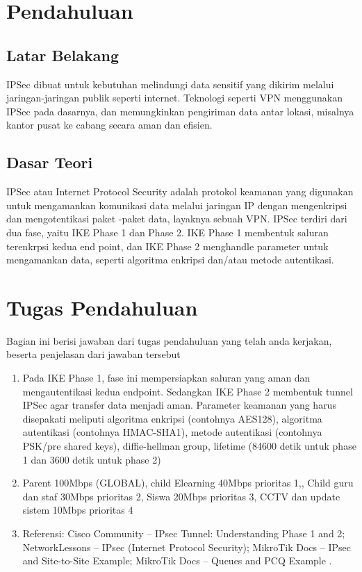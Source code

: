 \section{Pendahuluan}
\subsection{Latar Belakang}
IPSec dibuat untuk kebutuhan melindungi data sensitif yang dikirim melalui jaringan-jaringan publik seperti internet. Teknologi seperti VPN menggunakan IPSec pada dasarnya, dan memungkinkan pengiriman data antar lokasi, misalnya kantor pusat ke cabang secara aman dan efisien.

\subsection{Dasar Teori}
IPSec atau Internet Protocol Security adalah protokol keamanan yang digunakan untuk mengamankan komunikasi data melalui jaringan IP dengan mengenkripsi dan mengotentikasi paket -paket data, layaknya sebuah VPN. IPSec terdiri dari dua fase, yaitu IKE Phase 1 dan Phase 2. IKE Phase 1 membentuk saluran terenkrpsi kedua end point, dan IKE Phase 2 menghandle parameter untuk mengamankan data, seperti algoritma enkripsi dan/atau metode autentikasi.

\section{Tugas Pendahuluan}
Bagian ini berisi jawaban dari tugas pendahuluan yang telah anda kerjakan, beserta penjelasan dari jawaban tersebut
\begin{enumerate}
	\item Pada IKE Phase 1, fase ini mempersiapkan saluran yang aman dan mengautentikasi kedua endpoint. Sedangkan IKE Phase 2 membentuk tunnel IPSec agar transfer data menjadi aman. Parameter keamanan yang harus disepakati meliputi algoritma enkripsi (contohnya AES128), algoritma autentikasi (contohnya HMAC-SHA1), metode autentikasi (contohnya PSK/pre shared keys), diffie-hellman group, lifetime (84600 detik untuk phase 1 dan 3600 detik untuk phase 2)
        \item Parent 100Mbps (GLOBAL), child Elearning 40Mbps prioritas 1,, Child guru dan staf 30Mbps prioritas 2, Siswa 20Mbps prioritas 3, CCTV dan update sistem 10Mbps prioritas 4
        \item Referensi: Cisco Community – IPsec Tunnel: Understanding Phase 1 and 2; NetworkLessons – IPsec (Internet Protocol Security); MikroTik Docs – IPsec and Site-to-Site Example; MikroTik Docs – Queues and PCQ Example .
\end{enumerate}